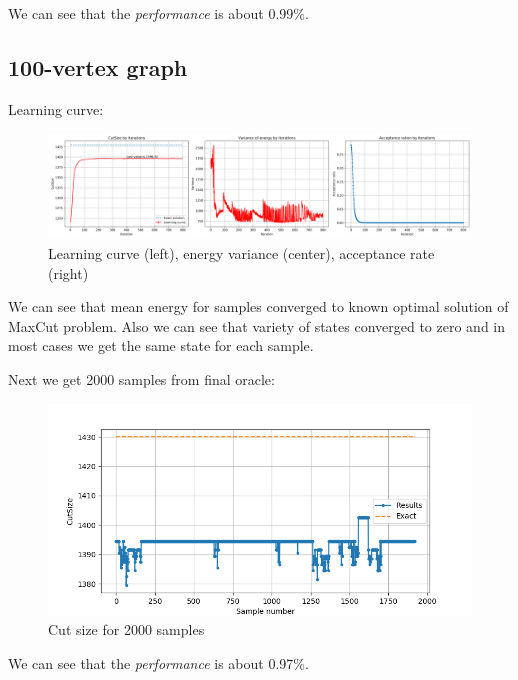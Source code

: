 \documentclass{article}
\begin{document}
We can see that the \textit{performance} is about 0.99\%.

\subsection{100-vertex graph}
Learning curve:
\begin{figure}
\centering
\includegraphics[scale=0.3]{resultPlot100}
\caption{Learning curve (left), energy variance (center), acceptance rate (right)}
\end{figure}

We can see that mean energy for samples converged to known optimal solution of MaxCut problem. Also we can see that variety of states converged to zero and in most cases we get the same state for each sample.

Next we get 2000 samples from final oracle:
\begin{figure}
\centering
\includegraphics[scale=0.4]{samples100}
\caption{Cut size for 2000 samples}
\end{figure}

We can see that the \textit{performance} is about 0.97\%.
\end{document}
